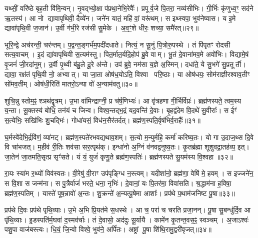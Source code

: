 यथ्सीं॒ वरि॑ष्ठे बृह॒ती वि॑मि॒न्वन्।
नृ॒वद्भ्यो॒क्षा प॑प्रथा॒नेभि॒रेवैः᳚।
प्रपूर्व॒जे पि॒तरा॒ नव्य॑सीभिः।
गी॒र्भिः कृ॑णुध्व॒ꣳ॒ सद॑ने ऋ॒तस्य॑।
आ नो द्यावापृथिवी॒ दैव्ये॑न।
जने॑न यातं॒ महि॑ वां॒ वरू॑थम्।
स इथ्स्वपा॒ भुव॑नेष्वास।
य इ॒मे द्यावा॑पृथि॒वी ज॒जान॑।
उ॒र्वी ग॑भी॒रे रज॑सी सु॒मेके।
अ॒व॒ꣳ॒शे धीरः॒ शच्या॒ समै॑रत्॥२९॥

भूरि॒न्द्वे अच॑रन्ती॒ चर॑न्तम्।
प॒द्वन्त॒ङ्गर्भ॑म॒पदी॑दधाते।
नित्यं॒ न सू॒नुं पि॒त्रोरु॒पस्थे।
तं पि॑पृतꣳ रोदसी सत्य॒वाचम्।
इ॒दं द्या॑वापृथिवी स॒त्यम॑स्तु।
पित॒र्मात॒र्यदि॒होप॑ ब्रु॒वे वाम्।
भू॒तं दे॒वाना॑मव॒मे अवो॑भिः।
विद्यामे॒षं वृ॒जनं॑ जी॒रदा॑नुम्।
उ॒र्वी पृ॒थ्वी ब॑हु॒ले दू॒रे अ॑न्ते।
उप॑ ब्रुवे॒ नम॑सा य॒ज्ञे अ॒स्मिन्।
दधा॑ते॒ ये सु॒भगे॑ सु॒प्रतूर्ती।
द्यावा॒ रक्ष॑तं पृथि॒वी नो॒ अभ्वात्।
या जा॒ता ओष॑ध॒योऽति॒ विश्वा परि॒ष्ठाः।
या ओष॑धयः॒ सोम॑राज्ञीरश्वाव॒तीꣳ सो॑मव॒तीम्।
ओष॑धी॒रिति॑ मातरो॒\-ऽन्या वो॑ अ॒न्याम॑वतु॥३०॥\anuvakamend[ह॒विर्नो॑ दाद्भभूव रा॒तिं पू॒र्वहू॑ताव॒र्कैरै॑रद॒स्मिन्पञ्च॑ च]

शुचि॒न्नु स्तोम॒ꣴ॒ श्ञथ॑द्वृ॒त्रम्।
उ॒भा वा॑मिन्द्राग्नी॒ प्र च॑र्\mbox{}ष॒णिभ्यः॑।
आ वृ॑त्रहणा गी॒र्भिर्विप्रः॑।
ब्रह्म॑णस्पते॒ त्वम॒स्य य॒न्ता।
सू॒क्तस्य॑ बोधि॒ तन॑यं च जिन्व।
विश्व॒न्तद्भ॒द्रं यद॒वन्ति॑ दे॒वाः।
बृ॒हद्व॑देम वि॒दथे॑ सु॒वीराः᳚।
स ईꣳ॑ स॒त्येभिः॒ सखि॑भिः शु॒चद्भिः॑।
गोधा॑यसं॒ विध॑न॒सैर॑तर्दत्।
ब्रह्म॑ण॒स्पति॒र्वृष॑भिर्व॒राहैः᳚॥३१॥

घ॒र्मस्वे॑देभि॒र्द्रवि॑णं॒ व्या॑नट्।
ब्रह्म॑ण॒स्पते॑रभवद्यथाव॒शम्।
स॒त्यो म॒न्युर्महि॒ कर्मा॑ करिष्य॒तः।
यो गा उ॒दाज॒थ्स दि॒वे वि चा॑भजत्।
म॒हीव॑ री॒तिः शव॑सा सर॒त्पृथ॑क्।
इन्धा॑नो अ॒ग्निं व॑नवद्वनुष्य॒तः।
कृ॒तब्र॑ह्मा शूशुवद्रा॒तह॑व्य॒ इत्।
जा॒तेन॑ जा॒तमति॒सृत्प्र सृꣳ॑सते।
यं यं॒ युजं॑ कृणु॒ते ब्रह्म॑ण॒स्पतिः॑।
ब्रह्म॑णस्पते सु॒यम॑स्य वि॒श्वहा॥३२॥

रा॒यः स्या॑म र॒थ्यो॑ विव॑स्वतः।
वी॒रेषु॑ वी॒राꣳ उप॑पृङ्ग्धि न॒स्त्वम्।
यदीशा॑नो॒ ब्रह्म॑णा॒ वेषि॑ मे॒ हवम्।
स इज्जने॑न॒ स वि॒शा स जन्म॑ना।
स पु॒त्रैर्वाजं॑ भरते॒ धना॒ नृभिः॑।
दे॒वानां॒ यः पि॒तर॑मा॒ विवा॑सति।
श्र॒द्धाम॑ना ह॒विषा॒ ब्रह्म॑ण॒स्पतिम्।
यास्ते॑ पूष॒न्नावो॑ अ॒न्तः।
शु॒क्रन्ते॑ अ॒न्यत्पू॒षेमा आशाः᳚।
प्रप॑थे प॒थाम॑जनिष्ट पू॒षा॥३३॥

प्रप॑थे दि॒वः प्रप॑थे पृथि॒व्याः।
उ॒भे अ॒भि प्रि॒यत॑मे स॒धस्थे।
आ च॒ परा॑ च चरति प्रजा॒नन्।
पू॒षा सु॒बन्धु॑र्दि॒व आ पृ॑थि॒व्याः।
इ॒डस्पति॑र्म॒घवा॑ द॒स्मव॑र्चाः।
तं दे॒वासो॒ अद॑दुः सू॒र्यायै।
कामे॑न कृ॒तन्त॒वस॒ꣴ॒ स्वञ्चम्।
अ॒जाऽश्वः॑ पशु॒पा वाज॑बस्त्यः।
धि॒यं॒ जि॒न्वो विश्वे॒ भुव॑ने॒ अर्पि॑तः।
अष्ट्रां पू॒षा शि॑थि॒रामु॒द्वरी॑वृजत्॥३४॥

